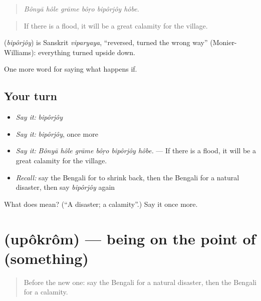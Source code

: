 \begin{quote}
\emph{Bônyā hôle grāme bôṛo bipôrjôy hôbe.}
\end{quote}

\begin{quote}
If there is a flood, it will be a great calamity for the village.
\end{quote}

\begin{cousinweb}
\textbf{} (\emph{bipôrjôy}) is Sanskrit \emph{viparyaya}, \textquotedblleft{}reversed, turned the wrong way\textquotedblright{} (Monier-Williams): everything turned upside down.
\end{cousinweb}

\begin{grammarlens}[title={What you've built}]
One more word for saying what happens if.
\end{grammarlens}

\subsection*{Your turn}
\begin{itemize}
\raggedright
  \item \emph{Say it:} \emph{bipôrjôy}
  \item \emph{Say it:} \emph{bipôrjôy}, once more
  \item \emph{Say it:} \emph{Bônyā hôle grāme bôṛo bipôrjôy hôbe.} — If there is a flood, it will be a great calamity for the village.
  \item \emph{Recall:} say the Bengali for to shrink back, then the Bengali for a natural disaster, then say \emph{bipôrjôy} again
\end{itemize}

\begin{tcolorbox}[breakable,colback=teal!4,colframe=teal!35!black,title={Before you move on}]
What does  mean? (\textquotedblleft{}A disaster; a calamity\textquotedblright{}.) Say it once more.
\end{tcolorbox}
\section[\texorpdfstring{\bn{উপক্রম} (upôkrôm)}{উপক্রম (upôkrôm)}]{ (upôkrôm) — being on the point of (something)}

\label{lesson:BN-C538-upokrom}



\begin{quote}
Before the new one: say the Bengali for a natural disaster, then the Bengali for a calamity.
\end{quote}

